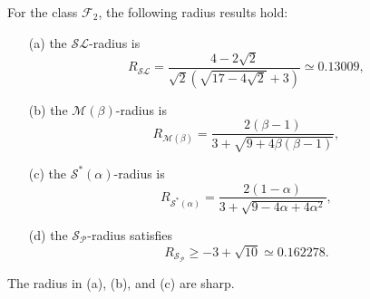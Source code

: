 \documentclass{amsart}
\begin{document}
\begin{theorem}\label{th5}
For the class $\mathcal{F}_2$,    the following radius results hold:
 \begin{enumerate}
  \item[(a)]\label{i1} the $ {\mathcal{SL}} $-radius  is  \[R_{\mathcal{SL}}= \frac{4-2\sqrt2}{ \sqrt2(\sqrt{17-4\sqrt2}+3)}\simeq0.13009,\]

  \item[(b)]\label{i2} the $ {\mathcal{M}(\beta)} $-radius  is   \[R_{\mathcal{M}(\beta)}= \frac{2(\beta-1)}{3+\sqrt{9+4\beta(\beta-1)}},\]

  \item[(c)]\label{ii1}the $ {\mathcal{S}^*(\alpha)} $-radius  is \[R_{\mathcal{S}^*(\alpha)}= \frac{2(1-\alpha )}{3+\sqrt{9-4\alpha +4\alpha ^2}},\]

 \item[(d)]\label{ii5} the ${\mathcal{S}_{\mathcal{P}}} $-radius satisfies  \[R_{\mathcal{S}_{\mathcal{P}}}\geq -3+\sqrt{10}\simeq0.162278.\]
 \end{enumerate}
The radius in (a), (b), and (c) are sharp.
\end{theorem}
\end{document}
